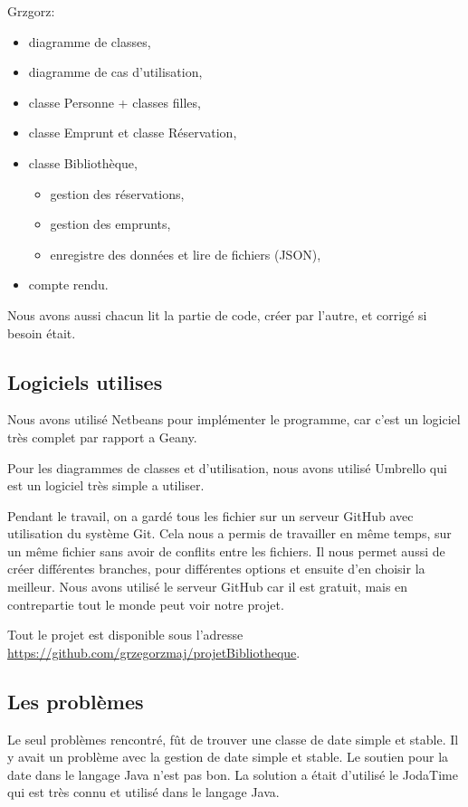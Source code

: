 \documentclass[10pt, a4paper]{article}
\begin{document}
		
		Grzgorz:
		\begin{itemize}
			\item diagramme de classes,
			\item diagramme de cas d'utilisation,			
			\item classe Personne + classes filles,
			\item classe Emprunt et classe Réservation,
			\item classe Bibliothèque,
			\begin{itemize}
				\item gestion des réservations,
				\item gestion des emprunts,
				\item enregistre des données et lire de fichiers (JSON),
			\end{itemize}
			\item compte rendu.
		\end{itemize}
		
		Nous avons aussi chacun lit la partie de code, créer par l'autre, et corrigé si besoin était.
		
		\subsection{Logiciels utilises}
		Nous avons utilisé Netbeans pour implémenter le programme, car c'est un logiciel très complet par 
		rapport a Geany.

		Pour les diagrammes de classes et d'utilisation, nous avons utilisé Umbrello qui est un logiciel 	
		très simple a utiliser.
		
		Pendant le travail, on a gardé tous les fichier sur un serveur GitHub avec utilisation du système 
		Git. Cela nous a permis de travailler en même temps, sur un même fichier sans avoir de conflits entre 
		les fichiers. Il nous permet aussi de créer différentes branches, pour différentes options et 
		ensuite d'en choisir la meilleur. Nous avons utilisé le serveur GitHub car il est gratuit, mais en 
		contrepartie tout le monde peut voir notre projet.
		
		Tout le projet est disponible sous l'adresse
		\url{https://github.com/grzegorzmaj/projetBibliotheque}.
		
		\subsection{Les problèmes}
		
		Le seul problèmes rencontré, fût de trouver une classe de date simple et stable. Il y avait un problème avec la gestion de 
		date simple et stable. Le soutien pour la date dans le langage Java n'est pas bon. La solution a était d'utilisé le JodaTime 
		qui est très connu et utilisé dans le langage Java.
		
	
\end{document}
